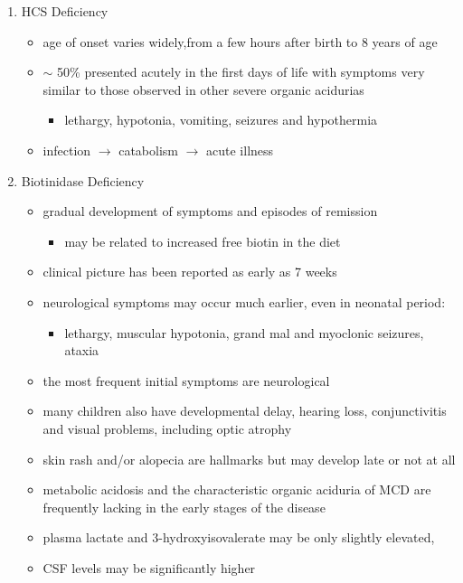 \documentclass{scrartcl}
\begin{document}
\begin{enumerate}
\item HCS Deficiency
\label{sec:org1ff2c94}
\begin{itemize}
\item age of onset varies widely,from a few hours after birth to 8 years
of age
\item \(\sim\) 50\% presented acutely in the first days of life with symptoms
very similar to those observed in other severe organic acidurias
\begin{itemize}
\item lethargy, hypotonia, vomiting, seizures and hypothermia
\end{itemize}
\item infection \(\to\) catabolism \(\to\) acute illness
\end{itemize}

\item Biotinidase Deficiency
\label{sec:orgfa9c057}
\begin{itemize}
\item gradual development of symptoms and episodes of remission
\begin{itemize}
\item may be related to increased free biotin in the diet
\end{itemize}
\item clinical picture has been reported as early as 7 weeks
\item neurological symptoms may occur much earlier, even in neonatal period:
\begin{itemize}
\item lethargy, muscular hypotonia, grand mal and myoclonic seizures, ataxia
\end{itemize}
\item the most frequent initial symptoms are neurological
\item many children also have developmental delay, hearing loss,
conjunctivitis and visual problems, including optic atrophy
\item skin rash and/or alopecia are hallmarks but may develop late or not
at all
\item metabolic acidosis and the characteristic organic aciduria of MCD
are frequently lacking in the early stages of the disease
\item plasma lactate and 3-hydroxyisovalerate may be only slightly
elevated,
\item CSF levels may be significantly higher
\end{itemize}
\end{enumerate}
\end{document}
